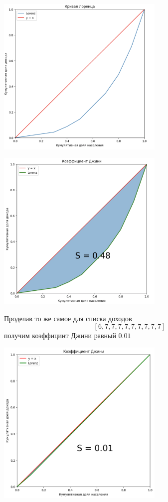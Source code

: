 \begin{itemize}
          \begin{center}
              \includegraphics[width=0.6\textwidth]{chapters/gini/pics/graph.png}
          \end{center}

          \begin{center}
              \includegraphics[width=0.6\textwidth]{chapters/gini/pics/gini.png}
          \end{center}

          Проделав то же самое для списка доходов $$[6, 7, 7, 7, 7, 7, 7, 7, 7, 7]$$ получим коэффицинт Джини равный $0.01$

          \begin{center}
              \includegraphics[width=0.6\textwidth]{chapters/gini/pics/gini2.png}
          \end{center}


\end{itemize}
